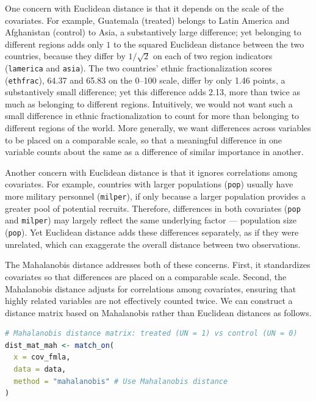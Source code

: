 \documentclass[twoside,11pt]{article}
\begin{document}
One concern with Euclidean distance is that it depends on the scale of
the covariates. For example, Guatemala (treated) belongs to Latin America
and Afghanistan (control) to Asia, a substantively large difference; yet
belonging to different regions adds only \(1\) to the squared Euclidean
distance between the two countries, because they differ by \(1/\sqrt{2}\) on
each of two region indicators (\texttt{lamerica} and \texttt{asia}). The two
countries' ethnic fractionalization scores (\texttt{ethfrac}), 64.37 and 65.83 on
the 0--100 scale, differ by only 1.46 points, a substantively small
difference; yet this difference adds 2.13, more than twice as much as
belonging to different regions. Intuitively, we would not want such a small
difference in ethnic fractionalization to count for more than belonging
to different regions of the world. More generally, we want
differences across variables to be placed on a comparable scale, so that
a meaningful difference in one variable counts about the same as a
difference of similar importance in another.

Another concern with Euclidean distance is that it ignores correlations
among covariates. For example, countries with larger populations
(\texttt{pop}) usually have more military personnel (\texttt{milper}),
if only because a larger population provides a greater pool of potential
recruits. Therefore, differences in both covariates (\texttt{pop} and
\texttt{milper}) may largely reflect the same underlying factor ---
population size (\texttt{pop}). Yet Euclidean distance adds these
differences separately, as if they were unrelated, which can exaggerate
the overall distance between two observations.

The Mahalanobis distance \citep{mahalanobis1936} addresses both of these
concerns. First, it standardizes covariates so that differences are
placed on a comparable scale. Second, the Mahalanobis distance adjusts
for correlations among covariates, ensuring that highly related
variables are not effectively counted twice. We can construct a distance
matrix based on Mahalanobis rather than Euclidean distances as follows.



\begin{lstlisting}[language=R]
# Mahalanobis distance matrix: treated (UN = 1) vs control (UN = 0)
dist_mat_mah <- match_on(
  x = cov_fmla,
  data = data,
  method = "mahalanobis" # Use Mahalanobis distance
)
\end{lstlisting}
\end{document}
